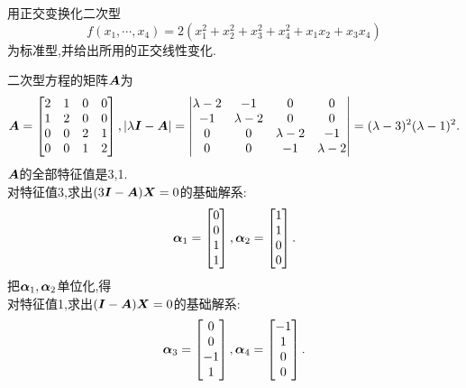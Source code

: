 \documentclass[lang=cn,11pt,normal]{elegantbook}
\begin{document}
	\begin{exercise}
		用正交变换化二次型
		\begin{equation}
		f(x_1,\cdots,x_4)=2(x_1^2+x_2^2+x_3^2+x_4^2+x_1x_2+x_3x_4)
		\end{equation}
		为标准型,并给出所用的正交线性变化.
	\end{exercise}
	\begin{solution}
		二次型方程的矩阵$\AA$为
		\begin{equation}
		\AA=
		\begin{bmatrix}
		2&1&0&0\\
		1&2&0&0\\
		0&0&2&1\\
		0&0&1&2
		\end{bmatrix},
		|\lambda\II-\AA|=
		\begin{vmatrix}
		\lambda-2&-1&0&0\\
		-1&\lambda-2&0&0\\
		0&0&\lambda-2&-1\\
		0&0&-1&\lambda-2
		\end{vmatrix}
		=(\lambda-3)^2(\lambda-1)^2.
		\end{equation}
		$\AA$的全部特征值是3,1.\\
		对特征值3,求出$(3\II-\AA)\XX=0$的基础解系:
		\begin{equation}
		\bfaf_1=
		\begin{bmatrix}
		0\\0\\1\\1
		\end{bmatrix},
		\bfaf_2=
		\begin{bmatrix}
		1\\1\\0\\0
		\end{bmatrix}.
		\end{equation}
		把$\bfaf_1,\bfaf_2$单位化,得\\
		对特征值1,求出$(\II-\AA)\XX=0$的基础解系:
		\begin{equation}
		\bfaf_3=
		\begin{bmatrix}
		0\\0\\-1\\1
		\end{bmatrix},
		\bfaf_4=
		\begin{bmatrix}
		-1\\1\\0\\0
		\end{bmatrix}.

\end{equation}
\end{solution}
\end{document}
